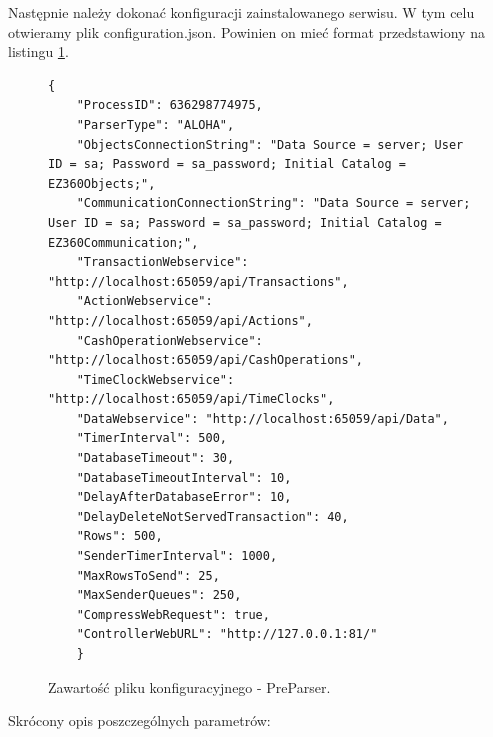 \documentclass[a4paper]{book}
\begin{document}
Następnie należy dokonać konfiguracji zainstalowanego serwisu. W tym celu otwieramy plik configuration.json. Powinien on mieć format przedstawiony na listingu \ref{lst:przykladowyPlikKonfiguracyjnyPreParser}.
\begin{figure}[h]
	\begin{lstlisting}[frame=single, breaklines=true]
	{
	"ProcessID": 636298774975,
	"ParserType": "ALOHA",
	"ObjectsConnectionString": "Data Source = server; User ID = sa; Password = sa_password; Initial Catalog = EZ360Objects;",
	"CommunicationConnectionString": "Data Source = server; User ID = sa; Password = sa_password; Initial Catalog = EZ360Communication;",
	"TransactionWebservice": "http://localhost:65059/api/Transactions",
	"ActionWebservice": "http://localhost:65059/api/Actions",
	"CashOperationWebservice": "http://localhost:65059/api/CashOperations",
	"TimeClockWebservice": "http://localhost:65059/api/TimeClocks",
	"DataWebservice": "http://localhost:65059/api/Data",
	"TimerInterval": 500,
	"DatabaseTimeout": 30,
	"DatabaseTimeoutInterval": 10,
	"DelayAfterDatabaseError": 10,
	"DelayDeleteNotServedTransaction": 40,
	"Rows": 500,
	"SenderTimerInterval": 1000,
	"MaxRowsToSend": 25,
	"MaxSenderQueues": 250,
	"CompressWebRequest": true,
	"ControllerWebURL": "http://127.0.0.1:81/"
	}
	\end{lstlisting}
	\caption{Zawartość pliku konfiguracyjnego - PreParser.}
	\label{lst:przykladowyPlikKonfiguracyjnyPreParser}
\end{figure}
Skrócony opis poszczególnych parametrów:
\end{document}
